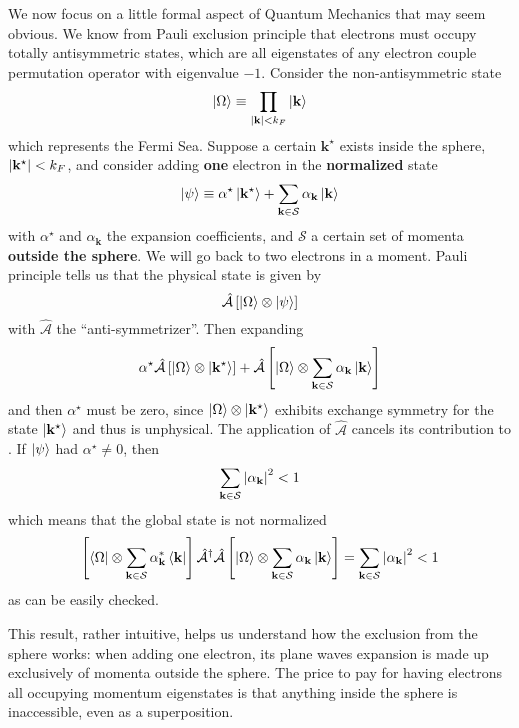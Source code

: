 We now focus on a little formal aspect of Quantum Mechanics that may seem obvious. We know from Pauli exclusion principle that electrons must occupy totally antisymmetric states, which are all eigenstates of any electron couple permutation operator with eigenvalue $-1$. Consider the non-antisymmetric state
\[
	\ket{\Omega} \equiv \prod_{\abs{\mathbf{k}} < k_F} \ket{\mathbf{k}}
\]
which represents the Fermi Sea. Suppose a certain $\mathbf{k}^\star$ exists inside the sphere, $\abs{\mathbf{k}^\star} < k_F$, and consider adding \textbf{one} electron in the \textbf{normalized} state
\[
	\ket{\psi} \equiv \alpha^\star \ket{\mathbf{k}^\star} + \sum_{\mathbf{k}\in\mathcal{S}} \alpha_\mathbf{k} \ket{\mathbf{k}}
\]
with $\alpha^\star$ and $\alpha_\mathbf{k}$ the expansion coefficients, and $\mathcal{S}$ a certain set of momenta \textbf{outside the sphere}. We will go back to two electrons in a moment. Pauli principle tells us that the physical state is given by
\[
	\hat{\mathcal{A}} \left[{\ket{\Omega}\otimes\ket{\psi}}\right]
\]
with $\hat{\mathcal{A}}$ the ``anti-symmetrizer''. Then expanding
\[
	\alpha^\star \hat{\mathcal{A}} \left[{\ket{\Omega}\otimes \ket{\mathbf{k}^\star}}\right] + \hat{\mathcal{A}} \left[{\ket{\Omega}\otimes\sum_{\mathbf{k}\in\mathcal{S}} \alpha_\mathbf{k} \ket{\mathbf{k}}}\right]
\]
and then $\alpha^\star$ must be zero, since $\ket{\Omega}\otimes \ket{\mathbf{k}^\star}$ exhibits exchange symmetry for the state $\ket{\mathbf{k}^\star}$ and thus is unphysical. The application of $\hat{\mathcal{A}}$ cancels its contribution to . If $\ket{\psi}$ had $\alpha^\star \neq 0$, then
\[
	\sum_{\mathbf{k}\in\mathcal{S}} \abs{\alpha_\mathbf{k}}^2 < 1
\]
which means that the global state is not normalized
\[
	\left[{\bra{\Omega}\otimes\sum_{\mathbf{k}\in\mathcal{S}} \alpha_\mathbf{k}^* \bra{\mathbf{k}}}\right] \hat{\mathcal{A}}^\dagger \hat{\mathcal{A}} \left[{\ket{\Omega}\otimes\sum_{\mathbf{k}\in\mathcal{S}} \alpha_\mathbf{k} \ket{\mathbf{k}}}\right] = \sum_{\mathbf{k}\in\mathcal{S}} \abs{\alpha_\mathbf{k}}^2 < 1
\]
as can be easily checked.

This result, rather intuitive, helps us understand how the exclusion from the sphere works: when adding one electron, its plane waves expansion is made up exclusively of momenta outside the sphere. The price to pay for having electrons all occupying momentum eigenstates is that anything inside the sphere is inaccessible, even as a superposition.

